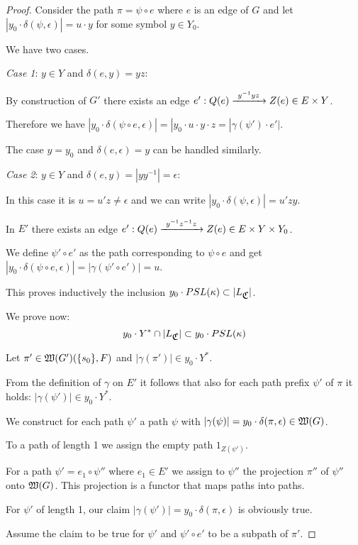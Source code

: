 \begin{proof}
Consider the path $\pi = \psi \circ e$ where $e$ is an edge of $G$ and let
$|y_0 \cdot \delta(\psi, \epsilon)| = u \cdot y$ for some symbol $y \in Y_0$.

We have two cases.

{\em Case 1}: $y \in Y$ and $\delta(e, y) = y z$:

By construction of $G'$ there exists an edge $e': Q(e) \xrightarrow{\ {y^{-1} y z}\ } Z(e)
\in E \times Y$.

Therefore we have $|y_0 \cdot \delta(\psi \circ e, \epsilon)| = |y_0 \cdot u
\cdot y \cdot z = |\gamma(\psi') \cdot e'|$.

The case $y=y_0$ and $\delta(e, \epsilon) = y$ can be handled similarly.

{\em Case 2}: $y \in Y$ and $\delta(e, y) = |y y^{-1}| = \epsilon$:

In this case it is $u = u' z \neq \epsilon$ and we can write $|y_0 \cdot
\delta(\psi, \epsilon)| = u'zy$.

In $E'$ there exists an edge $e' : Q(e) \xrightarrow{\ {y^{-1}z^{-1}z}\ } Z(e) \in E
\times Y \times Y_0$.

We define $\psi' \circ e'$ as the path corresponding to $\psi \circ e$ and get
$|y_0 \cdot \delta(\psi \circ e, \epsilon)| = |\gamma(\psi' \circ e')| = u$.

This proves inductively the inclusion $y_0 \cdot PSL(\kappa) \subset
|L_{\mbox{$\mathfrak{C}$}}|$.


We prove now:
\[ y_0 \cdot Y^* \cap |L_{\mbox{$\mathfrak{C}$}}| \subset y_0 \cdot PSL(\kappa) \]

Let $\pi' \in \mbox{$\mathfrak{W}({G'})$}(\mbox{$\{s_0\}$}, F)$ and $|\gamma(\pi')| \in y_0 \cdot
Y^*$.

From the definition of $\gamma$ on $E'$ it follows that also for each path
prefix $\psi'$ of $\pi$ it holds: $|\gamma(\psi')| \in y_0 \cdot Y^*$.

We construct for each path $\psi'$ a path $\psi$ with $|\gamma(\psi)| = y_0
\cdot \delta(\pi, \epsilon) \in \mbox{$\mathfrak{W}({G})$}$.

To a path of length 1 we assign the empty path $1_{Z(\psi')}$.

For a path $\psi' = e_1 \circ \psi''$ where $e_1 \in E'$ we assign to $\psi''$
the projection $\pi''$ of $\psi''$ onto $\mbox{$\mathfrak{W}({G})$}$. This projection is a
functor that maps paths into paths.

For $\psi'$ of length 1, our claim $|\gamma(\psi')| = y_0 \cdot \delta(\pi,
\epsilon)$ is obviously true.

Assume the claim to be true for $\psi'$ and $\psi' \circ e'$ to be a subpath of
$\pi'$.


\end{proof}

